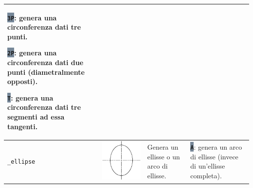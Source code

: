 \documentclass[..]{../IEEEphot}
\newcommand{\param}[1]{\colorbox{LightSlateGray}{\color{Navy}\texttt{\textbf{#1}}}}
\begin{document}
\begin{center}
\begin{longtable}{m{.1\linewidth}m{.2\linewidth}m{.3\linewidth}m{.3\linewidth}}
\param{3P}: genera una circonferenza dati tre punti.

\param{2P}: genera una circonferenza dati due punti (diametralmente opposti).

\param{T}: genera una circonferenza dati tre segmenti ad essa tangenti.
\\	

\midrule
\texttt{\_ellipse} & \includegraphics[width = 0.8\linewidth, keepaspectratio]{../images/jpg/_ellipse.jpg}
& Genera un ellisse o un arco di ellisse. & 
\param{A}: genera un arco di ellisse (invece di un'ellisse completa).


\end{longtable}
\end{center}
\end{document}
